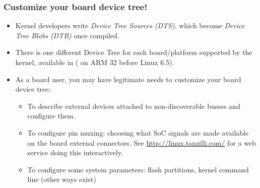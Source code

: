 \begin{frame}
  \frametitle{Customize your board device tree!}
  \begin{itemize}
  \item Kernel developers write {\em Device Tree Sources (DTS)},
    which become {\em Device Tree Blobs (DTB)} once compiled.
  \item There is one different Device Tree for each board/platform
    supported by the kernel, available in
    ( on ARM 32 before Linux 6.5).
  \item As a board user, you may have legitimate needs to customize
    your board device tree:
    \begin{itemize}
    \item To describe external devices attached to non-discoverable
      busses and configure them.
    \item To configure pin muxing: choosing what SoC signals are
      made available on the board external connectors.
      See \url{http://linux.tanzilli.com/} for a web service doing this
      interactively.
    \item To configure some system parameters: flash partitions,
      kernel command line (other ways exist)
    \end{itemize}
  \end{itemize}
\end{frame}
